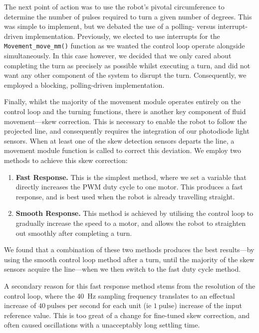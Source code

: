 \documentclass[conference]{IEEEtran}
\begin{document}
The next point of action was to use the robot's pivotal circumference to determine the number of pulses required to turn a given number of degrees.
This was simple to implement, but we debated the use of a polling- versus interrupt-driven implementation.
Previously, we elected to use interrupts for the \texttt{Movement\_move\_mm()} function as we wanted the control loop operate alongside simultaneously.
In this case however, we decided that we only cared about completing the turn as precisely as possible whilst executing a turn, and did not want any other component of the system to disrupt the turn.
Consequently, we employed a blocking, polling-driven implementation.

Finally, whilst the majority of the movement module operates entirely on the control loop and the turning functions, there is another key component of fluid movement—skew correction.
This is necessary to enable the robot to follow the projected line, and consequently requires the integration of our photodiode light sensors.
When at least one of the skew detection sensors departs the line, a movement module function is called to correct this deviation.
We employ two methods to achieve this skew correction:
\begin{enumerate}
	\item \textbf{Fast Response.}
	      This is the simplest method, where we set a variable that directly increases the PWM duty cycle to one motor.
	      This produces a fast response, and is best used when the robot is already travelling straight.
	\item \textbf{Smooth Response.}
	      This method is achieved by utilising the control loop to gradually increase the speed to a motor, and allows the robot to straighten out smoothly after completing a turn.
\end{enumerate}
We found that a combination of these two methods produces the best results—by using the smooth control loop method after a turn, until the majority of the skew sensors acquire the line—when we then switch to the fast duty cycle method.

A secondary reason for this fast response method stems from the resolution of the control loop, where the \qty{40}{\hertz} sampling frequency translates to an effectual increase of $\qty{40}{\text{pulses}}$ per second for each unit (ie $\qty{1}{\text{pulse}}$) increase of the input reference value.
This is too great of a change for fine-tuned skew correction, and often caused oscillations with a unacceptably long settling time.
\end{document}
